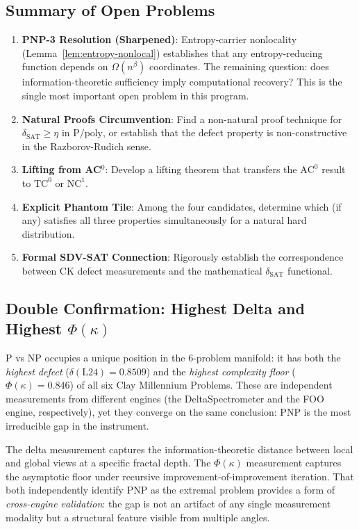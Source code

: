 \documentclass[11pt]{article}
\theoremstyle{definition}
\theoremstyle{remark}
\newcommand{\Ppoly}{\mathrm{P/poly}}
\newcommand{\ACz}{\mathrm{AC}^0}
\newcommand{\NCone}{\mathrm{NC}^1}
\newcommand{\TCz}{\mathrm{TC}^0}
\newcommand{\dSAT}{\delta_{\mathrm{SAT}}}
\begin{document}
\subsection{Summary of Open Problems}

\begin{enumerate}
  \item \textbf{PNP-3 Resolution (Sharpened)}: Entropy-carrier nonlocality
    (Lemma~\ref{lem:entropy-nonlocal}) establishes that any entropy-reducing
    function depends on $\Omega(n^\beta)$ coordinates.  The remaining question:
    does information-theoretic sufficiency imply computational recovery?
    This is the single most important open problem in this program.

  \item \textbf{Natural Proofs Circumvention}: Find a non-natural proof
    technique for $\dSAT \geq \eta$ in $\Ppoly$, or establish that the
    defect property is non-constructive in the Razborov-Rudich sense.

  \item \textbf{Lifting from AC$^0$}: Develop a lifting theorem that
    transfers the $\ACz$ result to $\TCz$ or $\NCone$.

  \item \textbf{Explicit Phantom Tile}: Among the four candidates, determine
    which (if any) satisfies all three properties simultaneously for a
    natural hard distribution.

  \item \textbf{Formal SDV-SAT Connection}: Rigorously establish the
    correspondence between CK defect measurements and the mathematical
    $\dSAT$ functional.
\end{enumerate}

\subsection{Double Confirmation: Highest Delta and Highest $\Phi(\kappa)$}

P vs NP occupies a unique position in the 6-problem manifold: it has both
the \emph{highest defect} ($\delta(\text{L24}) = 0.8509$) and the
\emph{highest complexity floor} ($\Phi(\kappa) = 0.846$) of all six Clay
Millennium Problems.  These are independent measurements from different
engines (the DeltaSpectrometer and the FOO engine, respectively), yet they
converge on the same conclusion: PNP is the most irreducible gap in the
instrument.

The delta measurement captures the information-theoretic distance between
local and global views at a specific fractal depth.  The $\Phi(\kappa)$
measurement captures the asymptotic floor under recursive
improvement-of-improvement iteration.  That both independently identify PNP
as the extremal problem provides a form of \emph{cross-engine validation}:
the gap is not an artifact of any single measurement modality but a
structural feature visible from multiple angles.
\end{document}
